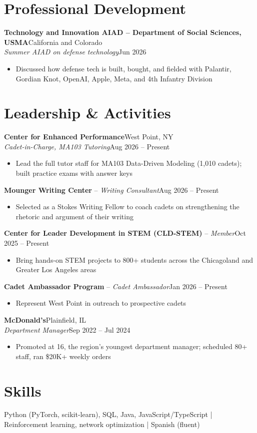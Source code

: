 \documentclass[10pt,letterpaper]{article}
\let\oldsection\section
\renewcommand{\section}{\needspace{3\baselineskip}\oldsection}
\newcommand{\entry}[4]{%
  \needspace{3\baselineskip}%
  \textbf{#1}\hfill #2\\
  \textit{#3}\hfill #4\par}
\newcommand{\compact}[3]{%
  \needspace{2\baselineskip}%
  \textbf{#1} -- \textit{#2}\hfill #3\par}
\begin{document}
\section{Professional Development}
\entry{Technology and Innovation AIAD -- Department of Social Sciences, USMA}{California and Colorado}{Summer AIAD on defense technology}{Jun 2026}
\begin{itemize}
  \item Discussed how defense tech is built, bought, and fielded with Palantir, Gordian Knot, OpenAI, Apple, Meta, and 4th Infantry Division
\end{itemize}

\section{Leadership \& Activities}
\entry{Center for Enhanced Performance}{West Point, NY}{Cadet-in-Charge, MA103 Tutoring}{Aug 2026 -- Present}
\begin{itemize}
  \item Lead the full tutor staff for MA103 Data-Driven Modeling (1,010 cadets); built practice exams with answer keys
\end{itemize}
\compact{Mounger Writing Center}{Writing Consultant}{Aug 2026 -- Present}
\begin{itemize}
  \item Selected as a Stokes Writing Fellow to coach cadets on strengthening the rhetoric and argument of their writing
\end{itemize}
\compact{Center for Leader Development in STEM (CLD-STEM)}{Member}{Oct 2025 -- Present}
\begin{itemize}
  \item Bring hands-on STEM projects to 800+ students across the Chicagoland and Greater Los Angeles areas
\end{itemize}
\compact{Cadet Ambassador Program}{Cadet Ambassador}{Jan 2026 -- Present}
\begin{itemize}
  \item Represent West Point in outreach to prospective cadets
\end{itemize}
\entry{McDonald's}{Plainfield, IL}{Department Manager}{Sep 2022 -- Jul 2024}
\begin{itemize}
  \item Promoted at 16, the region's youngest department manager; scheduled 80+ staff, ran \$20K+ weekly orders
\end{itemize}

\section{Skills}
Python (PyTorch, scikit-learn), SQL, Java, JavaScript/TypeScript \;|\; Reinforcement learning, network optimization \;|\; Spanish (fluent)
\end{document}
